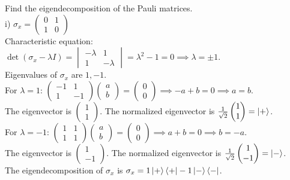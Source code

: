 \documentclass{article}
\newcommand{\0}{{$|0\rangle$}}
\newcommand{\1}{{$|1\rangle$}}
\begin{document}
Find the eigendecomposition of the Pauli matrices. \\
i) $\sigma_x = \begin{pmatrix} 0 & 1 \\ 1 & 0 \end{pmatrix}$ \\
Characteristic equation: $\det(\sigma_x - \lambda I) = \begin{vmatrix} -\lambda & 1 \\ 1 & -\lambda \end{vmatrix} = \lambda^2 - 1 = 0 \implies \lambda = \pm 1$. \\
Eigenvalues of $\sigma_x$ are $1, -1$. \\
For $\lambda = 1$: $\begin{pmatrix} -1 & 1 \\ 1 & -1 \end{pmatrix} \begin{pmatrix} a \\ b \end{pmatrix} = \begin{pmatrix} 0 \\ 0 \end{pmatrix} \implies -a+b=0 \implies a=b$. \\
The eigenvector is $\begin{pmatrix} 1 \\ 1 \end{pmatrix}$. The normalized eigenvector is $\frac{1}{\sqrt{2}}\begin{pmatrix} 1 \\ 1 \end{pmatrix} = \ket{+}$. \\
For $\lambda = -1$: $\begin{pmatrix} 1 & 1 \\ 1 & 1 \end{pmatrix} \begin{pmatrix} a \\ b \end{pmatrix} = \begin{pmatrix} 0 \\ 0 \end{pmatrix} \implies a+b=0 \implies b=-a$. \\
The eigenvector is $\begin{pmatrix} 1 \\ -1 \end{pmatrix}$. The normalized eigenvector is $\frac{1}{\sqrt{2}}\begin{pmatrix} 1 \\ -1 \end{pmatrix} = \ket{-}$. \\
The eigendecomposition of $\sigma_x$ is $\sigma_x = 1\ket{+}\bra{+} - 1\ket{-}\bra{-}$.
\end{document}
